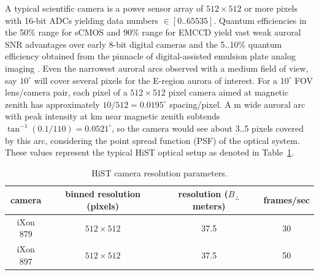 A typical scientific camera is a power sensor array of $512 \times 512$ or more pixels with 16-bit ADCs yielding data numbers $\in [0..65535]$.
Quantum efficiencies in the 50\% range for sCMOS and 90\% range for EMCCD yield vast weak auroral SNR advantages over early 8-bit digital cameras and the 5..10\% quantum efficiency obtained from the pinnacle of digital-assisted emulsion plate analog imaging \citep{parker1993}.
Even the narrowest auroral arcs observed with a medium field of view, say $10^\circ$ will cover several pixels for the E-region aurora of interest.
For a $10^\circ$ FOV lens/camera pair, each pixel of a $512\times512$ pixel camera aimed at magnetic zenith has approximately $10/512 = 0.0195^\circ$ spacing/pixel.
A \unit[100]{m} wide auroral arc with peak intensity at \unit[110]{km} near magnetic zenith subtends $\tan^{-1}(0.1/110) = 0.0521^\circ$, so the camera would see about 3..5 pixels covered by this arc, considering the point spread function (PSF) of the optical system.
These values represent the typical HiST optical setup as denoted in Table~\ref{tab:camerareshist}.
\begin{table}\centering
\caption{HiST camera resolution parameters.}\label{tab:camerareshist}
    \begin{tabular}{cccc}
        \toprule
        camera & binned resolution (pixels) & resolution ($B_\perp$ meters) & frames/sec\\
        \midrule
        iXon 879 & $512 \times 512$ & 37.5 & 30  \\
        iXon 897 & $512 \times 512$ & 37.5 & 50 \\
        \bottomrule
    \end{tabular}
\end{table}

